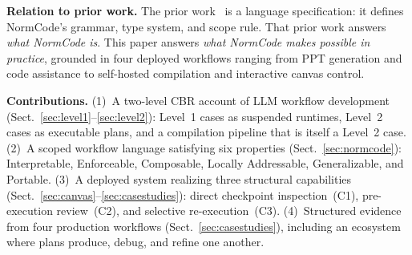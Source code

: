 \textbf{Relation to prior work.} The prior work~\cite{guan2026normcodesemiformallanguageauditable} is a
language specification: it defines NormCode's grammar, type system, and scope rule.
That prior work answers \textit{what NormCode is}. This paper answers \textit{what NormCode
makes possible in practice}, grounded in four deployed workflows ranging from PPT
generation and code assistance to self-hosted compilation and interactive canvas
control.

\textbf{Contributions.}
(1)~A two-level CBR account of LLM workflow development
(Sect.~\ref{sec:level1}--\ref{sec:level2}): Level~1 cases as suspended runtimes,
Level~2 cases as executable plans, and a compilation pipeline that is itself a
Level~2 case.
(2)~A scoped workflow language satisfying six properties
(Sect.~\ref{sec:normcode}): Interpretable, Enforceable, Composable, Locally
Addressable, Generalizable, and Portable.
(3)~A deployed system realizing three structural capabilities
(Sect.~\ref{sec:canvas}--\ref{sec:casestudies}): direct checkpoint inspection~(C1),
pre-execution review~(C2), and selective re-execution~(C3).
(4)~Structured evidence from four production workflows
(Sect.~\ref{sec:casestudies}), including an ecosystem where plans produce, debug,
and refine one another.
